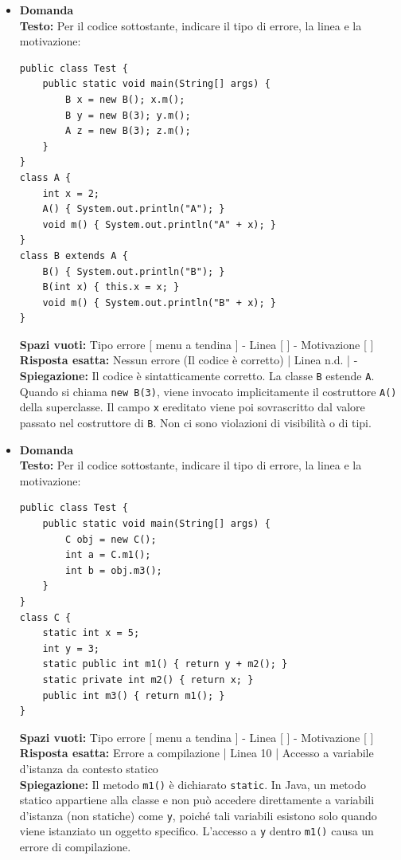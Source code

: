 \documentclass[12pt, a4paper]{article}
\begin{document}
\begin{itemize}
    \item {}\textbf{Domanda \thedomanda} \\
    \textbf{Testo:} Per il codice sottostante, indicare il tipo di errore, la linea e la motivazione:
\begin{verbatim}
public class Test {
    public static void main(String[] args) {
        B x = new B(); x.m();
        B y = new B(3); y.m();
        A z = new B(3); z.m();
    }
}
class A {
    int x = 2;
    A() { System.out.println("A"); }
    void m() { System.out.println("A" + x); }
}
class B extends A {
    B() { System.out.println("B"); }
    B(int x) { this.x = x; }
    void m() { System.out.println("B" + x); }
}
\end{verbatim}
    \textbf{Spazi vuoti:} Tipo errore [ menu a tendina ] - Linea [ \hspace{1cm} ] - Motivazione [ \hspace{1cm} ] \\
    \textbf{Risposta esatta:} Nessun errore (Il codice è corretto) | Linea n.d. | - \\
    \textbf{Spiegazione:} Il codice è sintatticamente corretto. La classe \texttt{B} estende \texttt{A}. Quando si chiama \texttt{new B(3)}, viene invocato implicitamente il costruttore \texttt{A()} della superclasse. Il campo \texttt{x} ereditato viene poi sovrascritto dal valore passato nel costruttore di \texttt{B}. Non ci sono violazioni di visibilità o di tipi.
    \vspace{0.5cm}

\newpage

    \item {}\textbf{Domanda \thedomanda} \\
    \textbf{Testo:} Per il codice sottostante, indicare il tipo di errore, la linea e la motivazione:
\begin{verbatim}
public class Test {
    public static void main(String[] args) {
        C obj = new C();
        int a = C.m1();
        int b = obj.m3();
    }
}
class C {
    static int x = 5;
    int y = 3;
    static public int m1() { return y + m2(); }
    static private int m2() { return x; }
    public int m3() { return m1(); }
}
\end{verbatim}
    \textbf{Spazi vuoti:} Tipo errore [ menu a tendina ] - Linea [ \hspace{1cm} ] - Motivazione [ \hspace{1cm} ] \\
    \textbf{Risposta esatta:} Errore a compilazione | Linea 10 | Accesso a variabile d'istanza da contesto statico \\
    \textbf{Spiegazione:} Il metodo \texttt{m1()} è dichiarato \texttt{static}. In Java, un metodo statico appartiene alla classe e non può accedere direttamente a variabili d'istanza (non statiche) come \texttt{y}, poiché tali variabili esistono solo quando viene istanziato un oggetto specifico. L'accesso a \texttt{y} dentro \texttt{m1()} causa un errore di compilazione.
    \vspace{0.5cm}


\end{itemize}
\end{document}
